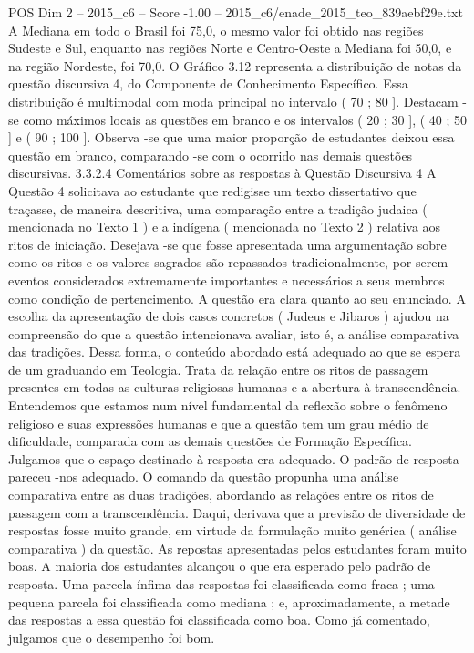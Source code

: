 \begin{textsample}{POS Dim 2 – 2015\_c6 – Score -1.00 – 2015\_c6/enade\_2015\_teo\_839aebf29e.txt}
A Mediana em todo o Brasil foi 75,0, o mesmo valor foi obtido nas regiões Sudeste e Sul, enquanto nas regiões Norte e Centro-Oeste a Mediana foi 50,0, e na região Nordeste, foi 70,0.
O Gráfico 3.12 representa a distribuição de notas da questão discursiva 4, do Componente de Conhecimento Específico.
Essa distribuição é multimodal com moda principal no intervalo ( 70 ; 80 ].
Destacam -se como máximos locais as questões em branco e os intervalos ( 20 ; 30 ], ( 40 ; 50 ] e ( 90 ; 100 ].
Observa -se que uma maior proporção de estudantes deixou essa questão em branco, comparando -se com o ocorrido nas demais questões discursivas. 3.3.2.4 Comentários sobre as respostas à Questão Discursiva 4 A Questão 4 solicitava ao estudante que redigisse um texto dissertativo que traçasse, de maneira descritiva, uma comparação entre a tradição judaica ( mencionada no Texto 1 ) e a indígena ( mencionada no Texto 2 ) relativa aos ritos de iniciação.
Desejava -se que fosse apresentada uma argumentação sobre como os ritos e os valores sagrados são repassados tradicionalmente, por serem eventos considerados extremamente importantes e necessários a seus membros como condição de pertencimento.
A questão era clara quanto ao seu enunciado.
A escolha da apresentação de dois casos concretos ( Judeus e Jibaros ) ajudou na compreensão do que a questão intencionava avaliar, isto é, a análise comparativa das tradições.
Dessa forma, o conteúdo abordado está adequado ao que se espera de um graduando em Teologia.
Trata da relação entre os ritos de passagem presentes em todas as culturas religiosas humanas e a abertura à transcendência.
Entendemos que estamos num nível fundamental da reflexão sobre o fenômeno religioso e suas expressões humanas e que a questão tem um grau médio de dificuldade, comparada com as demais questões de Formação Específica.
Julgamos que o espaço destinado à resposta era adequado.
O padrão de resposta pareceu -nos adequado.
O comando da questão propunha uma análise comparativa entre as duas tradições, abordando as relações entre os ritos de passagem com a transcendência.
Daqui, derivava que a previsão de diversidade de respostas fosse muito grande, em virtude da formulação muito genérica ( análise comparativa ) da questão.
As repostas apresentadas pelos estudantes foram muito boas.
A maioria dos estudantes alcançou o que era esperado pelo padrão de resposta.
Uma parcela ínfima das respostas foi classificada como fraca ; uma pequena parcela foi classificada como mediana ; e, aproximadamente, a metade das respostas a essa questão foi classificada como boa.
Como já comentado, julgamos que o desempenho foi bom.

\end{textsample}
